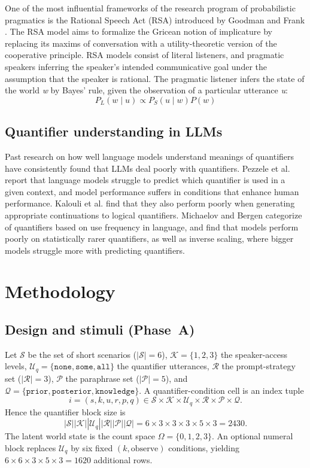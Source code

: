 \documentclass[11pt]{article}
\begin{document}
One of the most influential frameworks of the research program of probabilistic pragmatics is the Rational Speech Act (RSA) introduced by Goodman and Frank \cite{goodmanfrank2016}. The RSA model aims to formalize the Gricean notion of implicature by replacing its maxims of conversation with a utility-theoretic version of the
cooperative principle. RSA models consist of literal listeners, and pragmatic speakers inferring the speaker's intended communicative goal under the assumption that the speaker is rational. The pragmatic listener infers the state of the world \textit{w} by Bayes' rule, given the observation of a particular utterance \textit{u}:
\[
P_{L}(w\mid u)\propto P_{S}(u\mid w)P(w)
\]

\subsection{Quantifier understanding in LLMs}
Past research on how well language models understand meanings of quantifiers have consistently found that LLMs deal poorly with quantifiers. Pezzele et al. \cite{pezzelle2018} report that language models struggle to predict which quantifier is used in a given context, and model performance suffers in conditions that enhance human performance. Kalouli et al. \cite{kalouli2022} find that they also perform poorly when generating appropriate continuations to logical quantifiers. Michaelov and Bergen \cite{michaelovbergen2023} categorize of quantifiers based on use frequency in language, and find that models perform poorly on statistically rarer quantifiers, as well as inverse scaling, where bigger models struggle more with predicting quantifiers. 

\section{Methodology}
\label{System}

\subsection{Design and stimuli (Phase~A)}

Let $\mathcal{S}$ be the set of short scenarios ($|\mathcal{S}|=6$), $\mathcal{K}=\{1,2,3\}$ the speaker-access levels, $\mathcal{U}_q=\{\texttt{none},\texttt{some},\texttt{all}\}$ the quantifier utterances, $\mathcal{R}$ the prompt-strategy set ($|\mathcal{R}|=3$), $\mathcal{P}$ the paraphrase set ($|\mathcal{P}|=5$), and $\mathcal{Q}=\{\texttt{prior},\texttt{posterior},\texttt{knowledge}\}$. A quantifier-condition cell is an index tuple
\[
i=(s,k,u,r,p,q)\in \mathcal{S}\times\mathcal{K}\times\mathcal{U}_q\times\mathcal{R}\times\mathcal{P}\times\mathcal{Q}.
\]
Hence the quantifier block size is
\[
|\mathcal{S}||\mathcal{K}||\mathcal{U}_q||\mathcal{R}||\mathcal{P}||\mathcal{Q}|=6\times3\times3\times3\times5\times3=2430.
\]
The latent world state is the count space $\Omega=\{0,1,2,3\}$. An optional numeral block replaces $\mathcal{U}_q$ by six fixed $(k,\text{observe})$ conditions, yielding $6\times6\times3\times5\times3=1620$ additional rows.
\end{document}
